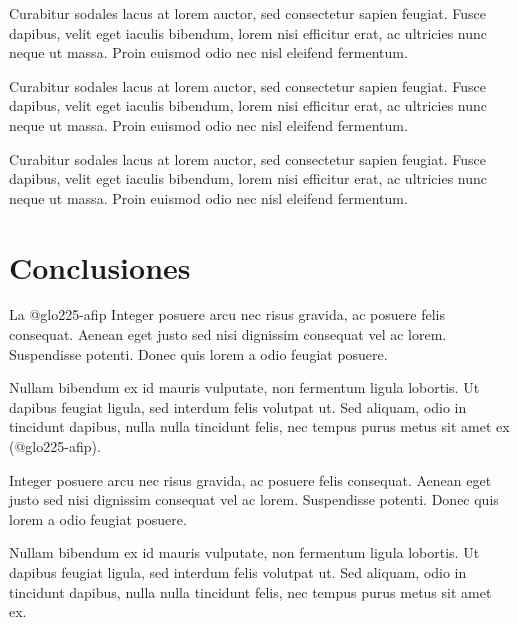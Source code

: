 Curabitur sodales lacus at lorem auctor, sed consectetur sapien feugiat. Fusce dapibus, velit eget iaculis bibendum, lorem nisi efficitur erat, ac ultricies nunc neque ut massa. Proin euismod odio nec nisl eleifend fermentum.

Curabitur sodales lacus at lorem auctor, sed consectetur sapien feugiat. Fusce dapibus, velit eget iaculis bibendum, lorem nisi efficitur erat, ac ultricies nunc neque ut massa. Proin euismod odio nec nisl eleifend fermentum.

Curabitur sodales lacus at lorem auctor, sed consectetur sapien feugiat. Fusce dapibus, velit eget iaculis bibendum, lorem nisi efficitur erat, ac ultricies nunc neque ut massa. Proin euismod odio nec nisl eleifend fermentum.

\section{Conclusiones}

La \gls{@glo225-afip} Integer posuere arcu nec risus gravida, ac posuere felis consequat. Aenean eget justo sed nisi dignissim consequat vel ac lorem. Suspendisse potenti. Donec quis lorem a odio feugiat posuere.

Nullam bibendum ex id mauris vulputate, non fermentum ligula lobortis. Ut dapibus feugiat ligula, sed interdum felis volutpat ut. Sed aliquam, odio in tincidunt dapibus, nulla nulla tincidunt felis, nec tempus purus metus sit amet ex (\gls{@glo225-afip}).


Integer posuere arcu nec risus gravida, ac posuere felis consequat. Aenean eget justo sed nisi dignissim consequat vel ac lorem. Suspendisse potenti. Donec quis lorem a odio feugiat posuere.

Nullam bibendum ex id mauris vulputate, non fermentum ligula lobortis. Ut dapibus feugiat ligula, sed interdum felis volutpat ut. Sed aliquam, odio in tincidunt dapibus, nulla nulla tincidunt felis, nec tempus purus metus sit amet ex.

